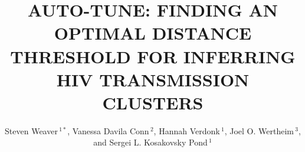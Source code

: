 \documentclass[utf8]{FrontiersinHarvard} %
\def\firstAuthorLast{Weaver {et~al.}} %
\def\Authors{Steven Weaver\,$^{1*}$, Vanessa Davila Conn\,$^{2}$, Hannah Verdonk\,$^{1}$, Joel O. Wertheim\,$^{3}$, and Sergei L. Kosakovsky Pond\,$^{1}$}
\begin{document}
\onecolumn
{}

\title { AUTO-TUNE: FINDING AN OPTIMAL DISTANCE THRESHOLD FOR INFERRING HIV TRANSMISSION CLUSTERS }

\author[\firstAuthorLast ]{\Authors} %
\address{} %
\correspondance{} %

\extraAuth{}%

\maketitle
\end{document}
